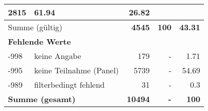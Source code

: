 \begin{longtable}{lXrrr}
       \num{2815} &
       \num[round-mode=places,round-precision=2]{61.94} &
         \num[round-mode=places,round-precision=2]{26.82} \\
     \midrule
     \multicolumn{2}{l}{Summe (gültig)} &
       \textbf{\num{4545}} &
     \textbf{\num{100}} &
       \textbf{\num[round-mode=places,round-precision=2]{43.31}} \\
     \multicolumn{5}{l}{\textbf{Fehlende Werte}}\\
       -998 &
       keine Angabe &
         \num{179} &
        - &
         \num[round-mode=places,round-precision=2]{1.71} \\
       -995 &
       keine Teilnahme (Panel) &
         \num{5739} &
        - &
         \num[round-mode=places,round-precision=2]{54.69} \\
       -989 &
       filterbedingt fehlend &
         \num{31} &
        - &
         \num[round-mode=places,round-precision=2]{0.3} \\
     \midrule
     \multicolumn{2}{l}{\textbf{Summe (gesamt)}} &
          \textbf{\num{10494}} &
        \textbf{-} &
        \textbf{\num{100}} \\
     \bottomrule
     \end{longtable}
     

